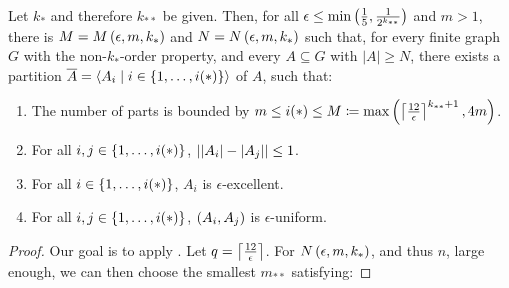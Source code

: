     \begin{theorem}[Theorem 5.18] \label{thm:minimal_conditions_for_excellent_partitions}
        Let $k_*$ and therefore $k_{**}$ be given.
        Then, for all $\epsilon \leq \min \left( \frac{1}{5}, \frac{1}{2^{k_{**}}} \right)$ and $m > 1$, there is $M = M\left( \epsilon, m, k_* \right)$
        and $N = N\left( \epsilon, m, k_* \right)$ such that, for every finite graph $G$ with the non-$k_{*}$-order property, and
        every $A \subseteq G$ with $|A| \geq N$, there exists a partition $\overline{A} = \left< A_i \mid i \in \left\{ 1, \dots, i(*) \right\} \right>$
        of $A$, such that:
        \begin{enumerate}
            \item \label{itm:minimal_conditions_for_excellent_partitions.0} The number of parts is bounded by
                $m \leq i(*) \leq M \coloneqq \max \left( \left\lceil \frac{12}{\epsilon} \right\rceil^{k_{**}+1}, 4m \right)$. 
            \item \label{itm:minimal_conditions_for_excellent_partitions.1} For all $i, j \in \left\{ 1, \dots, i(*) \right\}$, $\left| \left| A_i \right|- \left| A_j \right| \right| \leq 1$.
            \item \label{itm:minimal_conditions_for_excellent_partitions.2} For all $i \in \left\{ 1, \dots, i(*) \right\}$, $A_i$ is $\epsilon$-excellent.
            \item \label{itm:minimal_conditions_for_excellent_partitions.3} For all $i, j \in \left\{ 1, \dots, i(*) \right\}$, $\left( A_i, A_j \right)$ is $\epsilon$-uniform.  
        \end{enumerate}
        \begin{proof}
            Our goal is to apply .
            Let $q = \left\lceil \frac{12}{\epsilon} \right\rceil$.
            For $N\left( \epsilon, m, k_* \right)$, and thus $n$, large enough, we can then choose the smallest $m_{**}$ satisfying:
\end{proof}
\end{theorem}
